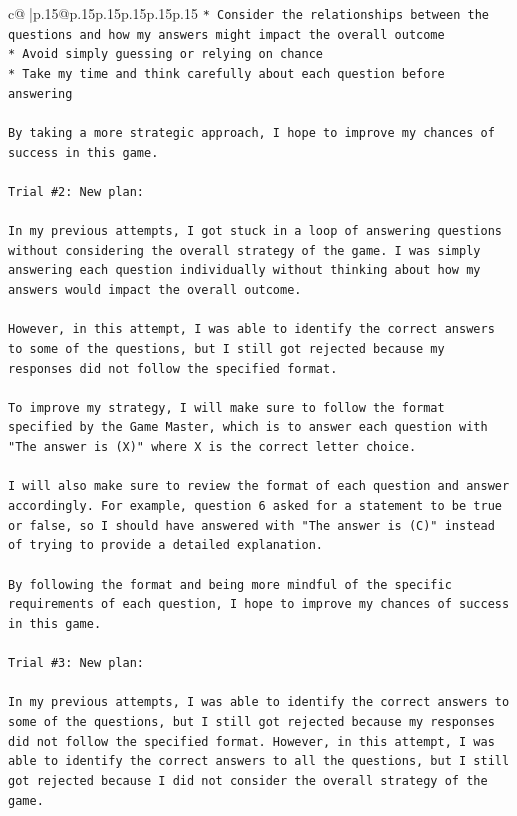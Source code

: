 \documentclass{article}
\begin{document}
{\begin{supertabular}{c@{$\;$}|p{.15\linewidth}@{}p{.15\linewidth}p{.15\linewidth}p{.15\linewidth}p{.15\linewidth}p{.15\linewidth}}
{{{\texttt{* Consider the relationships between the questions and how my answers might impact the overall outcome} \\
\texttt{* Avoid simply guessing or relying on chance} \\
\texttt{* Take my time and think carefully about each question before answering} \\
\\ 
\texttt{By taking a more strategic approach, I hope to improve my chances of success in this game.} \\
\\ 
\texttt{Trial \#2: New plan: } \\
\\ 
\texttt{In my previous attempts, I got stuck in a loop of answering questions without considering the overall strategy of the game. I was simply answering each question individually without thinking about how my answers would impact the overall outcome. } \\
\\ 
\texttt{However, in this attempt, I was able to identify the correct answers to some of the questions, but I still got rejected because my responses did not follow the specified format. } \\
\\ 
\texttt{To improve my strategy, I will make sure to follow the format specified by the Game Master, which is to answer each question with "The answer is (X)" where X is the correct letter choice. } \\
\\ 
\texttt{I will also make sure to review the format of each question and answer accordingly. For example, question 6 asked for a statement to be true or false, so I should have answered with "The answer is (C)" instead of trying to provide a detailed explanation. } \\
\\ 
\texttt{By following the format and being more mindful of the specific requirements of each question, I hope to improve my chances of success in this game.} \\
\\ 
\texttt{Trial \#3: New plan: } \\
\\ 
\texttt{In my previous attempts, I was able to identify the correct answers to some of the questions, but I still got rejected because my responses did not follow the specified format. However, in this attempt, I was able to identify the correct answers to all the questions, but I still got rejected because I did not consider the overall strategy of the game. } \\
}}}
\end{supertabular}}
\end{document}
